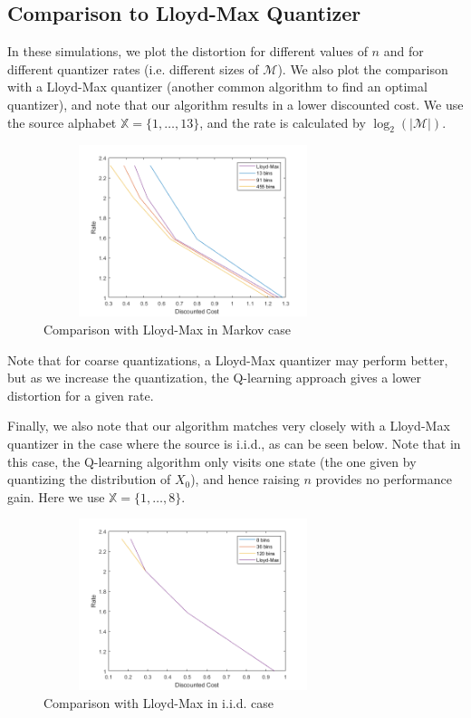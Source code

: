 \documentclass[conference]{IEEEtran}
\begin{document}
\subsection{Comparison to Lloyd-Max Quantizer}
In these simulations, we plot the distortion for different values of \( n \) and for different quantizer rates (i.e. different sizes of \(\mathcal{M}\)). We also plot the comparison with a Lloyd-Max quantizer (another common algorithm to find an optimal quantizer), and note that our algorithm results in a lower discounted cost. We use the source alphabet \( \mathbb{X} = \{1,\ldots,13\} \), and the rate is calculated by \(\log_2(|\mathcal{M}|)\).
\vspace{-1em}
\begin{figure}[H]
    \centering
    \includegraphics[height=5cm, width=8.75cm]{rate_distortion_lloydmax.png}
    \caption{Comparison with Lloyd-Max in Markov case}
\end{figure}

Note that for coarse quantizations, a Lloyd-Max quantizer may perform better, but as we increase the quantization, the Q-learning approach gives a lower distortion for a given rate.

Finally, we also note that our algorithm matches very closely with a Lloyd-Max quantizer in the case where the source is i.i.d., as can be seen below. Note that in this case, the Q-learning algorithm only visits one state (the one given by quantizing the distribution of \(X_0\)), and hence raising \(n\) provides no performance gain. Here we use \( \mathbb{X} = \{1,\ldots,8\} \).
\vspace{-1em}
\begin{figure}[H]
    \centering
    \includegraphics[height=5cm, width=8.75cm]{lloydmax_scalar.png}
    \caption{Comparison with Lloyd-Max in i.i.d. case}
\end{figure}
\end{document}
